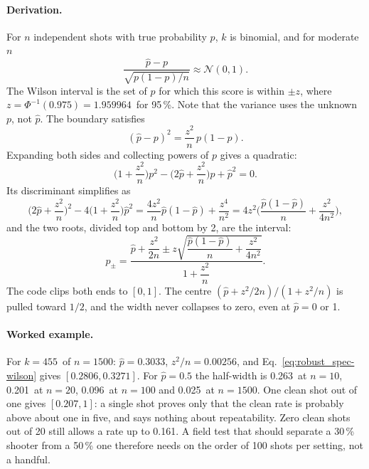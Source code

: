 \paragraph{Derivation.}
For $n$ independent shots with true probability $p$, $k$ is binomial, and for moderate $n$
\begin{equation}
  \frac{\hat p-p}{\sqrt{p(1-p)/n}}\approx\mathcal N(0,1).
  \label{eq:robust_spec-wilson-z}
\end{equation}
The Wilson interval is the set of $p$ for which this score is within $\pm z$, where
$z=\Phi^{-1}(0.975)=1.959964$\derived\ for 95\,\%.
Note that the variance uses the unknown $p$, not $\hat p$.
The boundary satisfies
\begin{equation}
  (\hat p-p)^2 = \frac{z^2}{n}\,p(1-p).
  \label{eq:robust_spec-wilson-quad}
\end{equation}
Expanding both sides and collecting powers of $p$ gives a quadratic:
\begin{equation}
  \Big(1+\frac{z^2}{n}\Big)p^2 - \Big(2\hat p+\frac{z^2}{n}\Big)p + \hat p^2 = 0 .
  \label{eq:robust_spec-wilson-poly}
\end{equation}
Its discriminant simplifies as
\begin{equation}
  \Big(2\hat p+\frac{z^2}{n}\Big)^2 - 4\Big(1+\frac{z^2}{n}\Big)\hat p^2
  = \frac{4z^2}{n}\hat p(1-\hat p) + \frac{z^4}{n^2}
  = 4z^2\Big(\frac{\hat p(1-\hat p)}{n}+\frac{z^2}{4n^2}\Big),
  \label{eq:robust_spec-wilson-disc}
\end{equation}
and the two roots, divided top and bottom by 2, are the interval:
\begin{equation}
  p_\pm = \frac{\hat p + \dfrac{z^2}{2n} \pm z\sqrt{\dfrac{\hat p(1-\hat p)}{n}+\dfrac{z^2}{4n^2}}}{1+\dfrac{z^2}{n}} .
  \label{eq:robust_spec-wilson}
\end{equation}
The code clips both ends to $[0,1]$.
The centre $(\hat p+z^2/2n)/(1+z^2/n)$ is pulled toward $1/2$, and the width never collapses to
zero, even at $\hat p = 0$ or 1.

\paragraph{Worked example.}
For $k=455$\predicted\ of $n=1500$\assumed: $\hat p=0.3033$\derived, $z^2/n=0.00256$\derived, and
Eq.~\eqref{eq:robust_spec-wilson} gives $[0.2806, 0.3271]$\derived.
For $\hat p = 0.5$ the half-width is 0.263\derived\ at $n=10$, 0.201\derived\ at $n=20$,
0.096\derived\ at $n=100$ and 0.025\derived\ at $n=1500$.
One clean shot out of one gives $[0.207, 1]$\derived: a single shot proves only that the clean rate is
probably above about one in five, and says nothing about repeatability.
Zero clean shots out of 20 still allows a rate up to 0.161\derived.
A field test that should separate a 30\,\% shooter from a 50\,\% one therefore needs on the order of
100 shots per setting, not a handful.

